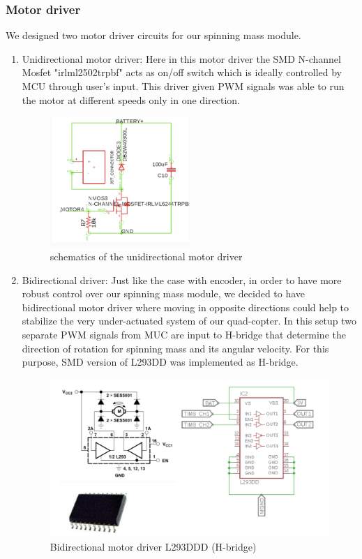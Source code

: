 \subsubsection{Motor driver}
We designed two motor driver circuits for our spinning mass module. 
\begin{enumerate}
 \item Unidirectional motor driver: 
 Here in this motor driver the SMD N-channel Mosfet "irlml2502trpbf" acts as on/off switch which is ideally controlled by MCU through user's input. This driver given PWM signals was able to run the motor at different speeds only in one direction. 
\begin{figure}[H]
\centering
\includegraphics[width=0.5\textwidth]{./Amir_img/uniDriver.png}
\caption{schematics of the unidirectional motor driver}
\end{figure} 
 \item Bidirectional driver:
 Just like the case with encoder, in order to have more robust control over our spinning mass module, we decided to have bidirectional motor driver where moving in opposite directions could help to stabilize the very under-actuated system of our quad-copter. In this setup two separate PWM signals from MUC are input to H-bridge that determine the direction of rotation for spinning mass and its angular velocity. For this purpose, SMD version of L293DD was implemented as H-bridge. 
 \begin{figure}[H]
\centering
\includegraphics[width=1\textwidth]{./Amir_img/smdHb2.png}
\caption{Bidirectional motor driver L293DDD (H-bridge)}
\end{figure} 
\end{enumerate}
